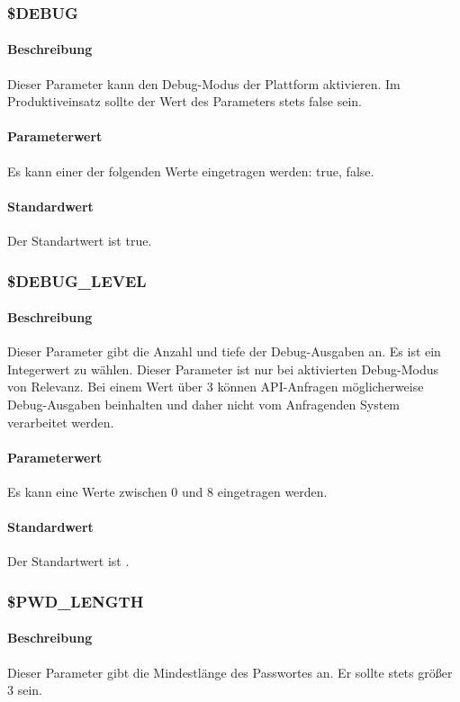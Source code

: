 \subsubsection{\$DEBUG}
\paragraph{Beschreibung}Dieser Parameter kann den Debug-Modus der Plattform aktivieren. Im Produktiveinsatz sollte der Wert des Parameters stets {\glqq false\grqq} sein.
\paragraph{Parameterwert}Es kann einer der folgenden Werte eingetragen werden: {\glqq true\grqq}, {\glqq false\grqq}.
\paragraph{Standardwert}Der Standartwert ist {\glqq true\grqq}.

\subsubsection{\$DEBUG\_LEVEL} \label{config:debug-level}
\paragraph{Beschreibung}Dieser Parameter gibt die Anzahl und tiefe der Debug-Ausgaben an. Es ist ein Integerwert zu wählen. Dieser Parameter ist nur bei aktivierten Debug-Modus von Relevanz. Bei einem Wert über 3 können API-Anfragen möglicherweise Debug-Ausgaben beinhalten und daher nicht vom Anfragenden System verarbeitet werden.
\paragraph{Parameterwert}Es kann eine Werte zwischen 0 und 8 eingetragen werden.
\paragraph{Standardwert}Der Standartwert ist {\grqq}.

\subsubsection{\$PWD\_LENGTH}
\paragraph{Beschreibung}Dieser Parameter gibt die Mindestlänge des Passwortes an. Er sollte stets größer 3 sein.
